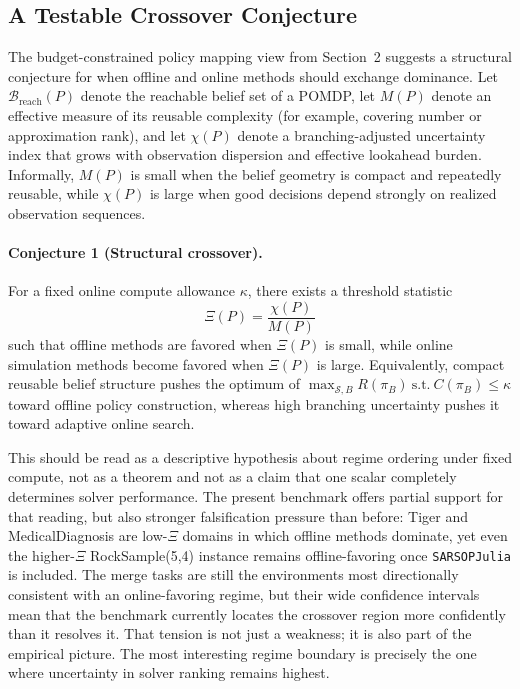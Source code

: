 \documentclass[10pt,twocolumn]{article}
\begin{document}
\subsection{A Testable Crossover Conjecture}
The budget-constrained policy mapping view from Section~2 suggests a structural conjecture for when offline and online methods should exchange dominance. Let $\mathcal{B}_{\mathrm{reach}}(P)$ denote the reachable belief set of a POMDP, let $M(P)$ denote an effective measure of its reusable complexity (for example, covering number or approximation rank), and let $\chi(P)$ denote a branching-adjusted uncertainty index that grows with observation dispersion and effective lookahead burden. Informally, $M(P)$ is small when the belief geometry is compact and repeatedly reusable, while $\chi(P)$ is large when good decisions depend strongly on realized observation sequences.

\paragraph{Conjecture 1 (Structural crossover).}
For a fixed online compute allowance $\kappa$, there exists a threshold statistic
\begin{equation}
\Xi(P) = \frac{\chi(P)}{M(P)}
\end{equation}
such that offline methods are favored when $\Xi(P)$ is small, while online simulation methods become favored when $\Xi(P)$ is large. Equivalently, compact reusable belief structure pushes the optimum of
\(
\max_{\mathcal{S},B} R(\pi_B)\ \text{s.t.}\ C(\pi_B)\le\kappa
\)
toward offline policy construction, whereas high branching uncertainty pushes it toward adaptive online search.

This should be read as a descriptive hypothesis about regime ordering under fixed compute, not as a theorem and not as a claim that one scalar completely determines solver performance. The present benchmark offers partial support for that reading, but also stronger falsification pressure than before: Tiger and MedicalDiagnosis are low-$\Xi$ domains in which offline methods dominate, yet even the higher-$\Xi$ RockSample(5,4) instance remains offline-favoring once \texttt{SARSOPJulia} is included. The merge tasks are still the environments most directionally consistent with an online-favoring regime, but their wide confidence intervals mean that the benchmark currently locates the crossover region more confidently than it resolves it. That tension is not just a weakness; it is also part of the empirical picture. The most interesting regime boundary is precisely the one where uncertainty in solver ranking remains highest.
\end{document}

